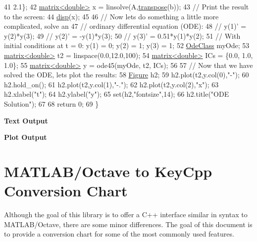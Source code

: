 \begin{DoxyCodeInclude}
41                         2.1\};
42     \hyperlink{classkeycpp_1_1matrix}{matrix<double>} x = linsolve(A,\hyperlink{namespacekeycpp_a7fd5ce0385e9cc7bed5b44ed8475e8aa}{transpose}(b));
43     \textcolor{comment}{// Print the result to the screen:}
44     \hyperlink{namespacekeycpp_af4a2245da139cf6cf2e03426476b3b88}{disp}(x);
45 
46     \textcolor{comment}{// Now lets do something a little more complicated, solve an}
47     \textcolor{comment}{// ordinary differential equation (ODE):}
48     \textcolor{comment}{// y(1)' = y(2)*y(3);}
49     \textcolor{comment}{// y(2)' = -y(1)*y(3);}
50     \textcolor{comment}{// y(3)' = 0.51*y(1)*y(2);}
51     \textcolor{comment}{// With initial conditions at t = 0: y(1) = 0; y(2) = 1; y(3) = 1;}
52     \hyperlink{class_ode_class}{OdeClass} myOde;
53     \hyperlink{classkeycpp_1_1matrix}{matrix<double>} t2 = linspace(0.0,12.0,100);
54     \hyperlink{classkeycpp_1_1matrix}{matrix<double>} ICs = \{0.0, 1.0, 1.0\};
55     \hyperlink{classkeycpp_1_1matrix}{matrix<double>} y = ode45(myOde, t2, ICs);
56     
57     \textcolor{comment}{// Now that we have solved the ODE, lets plot the results:}
58     \hyperlink{classkeycpp_1_1_figure}{Figure} h2;
59     h2.plot(t2,y.col(0),\textcolor{stringliteral}{"-"});
60     h2.hold\_on();
61     h2.plot(t2,y.col(1),\textcolor{stringliteral}{"-."});
62     h2.plot(t2,y.col(2),\textcolor{stringliteral}{"x"});
63     h2.xlabel(\textcolor{stringliteral}{"t"});
64     h2.ylabel(\textcolor{stringliteral}{"y"});
65     set(h2,\textcolor{stringliteral}{"fontsize"},14);
66     h2.title(\textcolor{stringliteral}{"ODE Solution"});
67 
68     \textcolor{keywordflow}{return} 0;
69 \}
\end{DoxyCodeInclude}
 \par
 \label{_output}%
 {\bfseries {\ttfamily Text} Output} 
\begin{DoxyCodeInclude}
\end{DoxyCodeInclude}
 \par
 {\bfseries {\ttfamily Plot} Output}  \par
  \par


\section*{M\-A\-T\-L\-A\-B/\-Octave to Key\-Cpp Conversion Chart}

Although the goal of this library is to offer a C++ interface similar in syntax to M\-A\-T\-L\-A\-B/\-Octave, there are some minor differences. The goal of this document is to provide a conversion chart for some of the most commonly used features.

